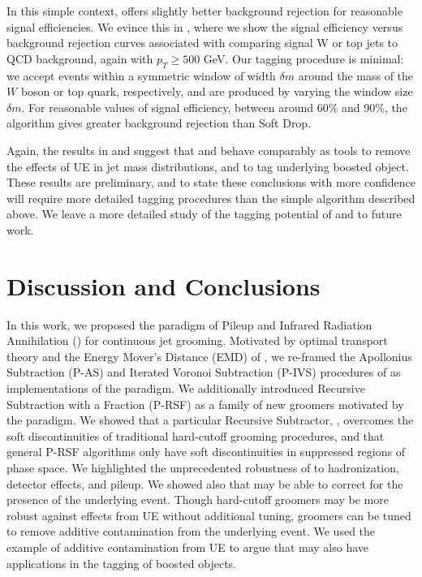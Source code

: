    In this simple context,  offers slightly better background rejection for reasonable signal efficiencies.
   We evince this in , where we show the signal efficiency versus background rejection curves associated with comparing signal W or top jets to QCD background, again with \(p_T \geq 500\) GeV.
   Our tagging procedure is minimal:
   we accept events within a symmetric window of width \(\delta m\) around the mass of the \(W\) boson or top quark, respectively, and  are produced by varying the window size \(\delta m\).
   For reasonable values of signal efficiency, between around 60\% and 90\%, the  algorithm gives greater background rejection than Soft Drop.

   Again, the results in  and  suggest that  and  behave comparably as tools to remove the effects of UE in jet mass distributions, and to tag underlying boosted object.
   These results are preliminary, and to state these conclusions with more confidence will require more detailed tagging procedures than the simple algorithm described above.
   We leave a more detailed study of the tagging potential of  and \PIRANHA{} to future work.


\section{Discussion and Conclusions}
\label{sec:Conclusions}

In this work, we proposed the paradigm of Pileup and Infrared Radiation Annihilation (\PIRANHA{}) for continuous jet grooming.
%
Motivated by optimal transport theory and the Energy Mover's Distance (EMD) of , we re-framed the Apollonius Subtraction (P-AS) and Iterated Voronoi Subtraction (P-IVS) procedures of  as implementations of the \PIRANHA{} paradigm.
%
We additionally introduced Recursive Subtraction with a Fraction (P-RSF) as a family of new groomers motivated by the \PIRANHA{} paradigm.
%
We showed that a particular Recursive Subtractor, , overcomes the soft discontinuities of traditional hard-cutoff grooming procedures, and that general P-RSF algorithms only have soft discontinuities in suppressed regions of phase space.
%
We highlighted the unprecedented robustness of  to hadronization, detector effects, and pileup.
%
We showed also that  may be able to correct for the presence of the underlying event.
%
Though hard-cutoff groomers may be more robust against effects from UE without additional tuning, \PIRANHA{} groomers can be tuned to remove additive contamination from the underlying event.
%
We used the example of additive contamination from UE to argue that \PIRANHA{} may also have applications in the tagging of boosted objects.

